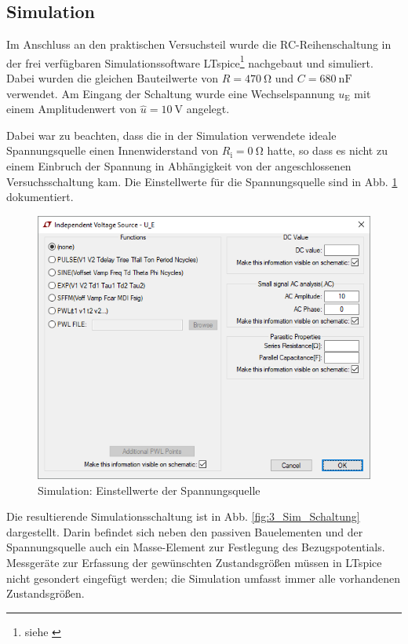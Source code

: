 \subsection{Simulation}
\label{subsec:3_Simulation}
%
Im Anschluss an den praktischen Versuchsteil wurde die RC-Reihenschaltung in der frei verfügbaren Simulationssoftware LTspice\footnote{siehe \cite{src:LTspice}} nachgebaut und simuliert. Dabei wurden die gleichen Bauteilwerte von $R = \SI{470}{\ohm}$ und $C = \SI{680}{\nano\farad}$ verwendet. Am Eingang der Schaltung wurde eine Wechselspannung $u_\mathrm{E}$ mit einem Amplitudenwert von $\hat{u} = \SI{10}{\volt}$ angelegt.
\par
Dabei war zu beachten, dass die in der Simulation verwendete ideale Spannungsquelle einen Innenwiderstand von $R_\mathrm{i} = \SI{0}{\ohm}$ hatte, so dass es nicht zu einem Einbruch der Spannung in Abhängigkeit von der angeschlossenen Versuchsschaltung kam. Die Einstellwerte für die Spannungsquelle sind in Abb. \ref{fig:3_Sim_Spannungsquelle} dokumentiert.
%
\begin{figure}[H]
  \centering
  \includegraphics[width=0.9\linewidth]{src/3_Sim_Spannungsquelle.png}
  \caption{Simulation: Einstellwerte der Spannungsquelle}
  \label{fig:3_Sim_Spannungsquelle}
\end{figure}
\par
Die resultierende Simulationsschaltung ist in Abb. \ref{fig:3_Sim_Schaltung} dargestellt. Darin befindet sich neben den passiven Bauelementen und der Spannungsquelle auch ein Masse-Element zur Festlegung des Bezugspotentials. Messgeräte zur Erfassung der gewünschten Zustandsgrößen müssen in LTspice nicht gesondert eingefügt werden; die Simulation umfasst immer alle vorhandenen Zustandsgrößen.
